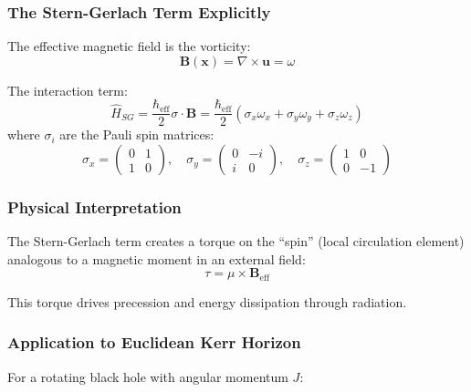 \documentclass[11pt]{article}
\begin{document}
\subsubsection{The Stern-Gerlach Term Explicitly}

The effective magnetic field is the vorticity:
\begin{equation}
\mathbf{B}(\mathbf{x}) = \nabla \times \mathbf{u} = \omega
\end{equation}

The interaction term:
\begin{equation}
\hat{H}_{SG} = \frac{\hbar_{\text{eff}}}{2}\sigma \cdot \mathbf{B} = \frac{\hbar_{\text{eff}}}{2}(\sigma_x \omega_x + \sigma_y \omega_y + \sigma_z \omega_z)
\end{equation}
where $\sigma_i$ are the Pauli spin matrices:
\begin{equation}
\sigma_x = \begin{pmatrix} 0 & 1 \\ 1 & 0 \end{pmatrix}, \quad
\sigma_y = \begin{pmatrix} 0 & -i \\ i & 0 \end{pmatrix}, \quad
\sigma_z = \begin{pmatrix} 1 & 0 \\ 0 & -1 \end{pmatrix}
\end{equation}

\subsubsection{Physical Interpretation}

The Stern-Gerlach term creates a torque on the ``spin'' (local circulation element) analogous to a magnetic moment in an external field:
\begin{equation}
\tau = \mu \times \mathbf{B}_{\text{eff}}
\end{equation}

This torque drives precession and energy dissipation through radiation.

\subsubsection{Application to Euclidean Kerr Horizon}

For a rotating black hole with angular momentum $J$:
\end{document}
